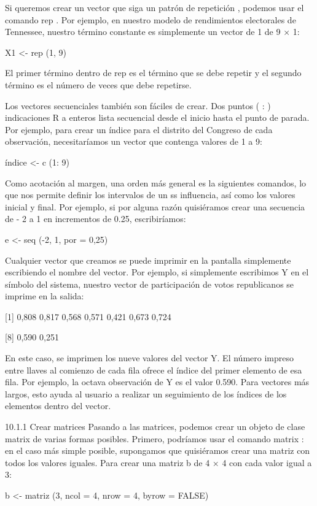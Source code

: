 \documentclass[
]{book}
\begin{document}
Si queremos crear un vector que siga un patrón de repetición , podemos usar el comando rep . Por ejemplo, en nuestro modelo de rendimientos electorales de Tennessee, nuestro término constante es simplemente un vector de 1 de 9 × 1:

X1 \textless- rep (1, 9)

El primer término dentro de rep es el término que se debe repetir y el segundo término es el número de veces que debe repetirse.

Los vectores secuenciales también son fáciles de crear. Dos puntos ( : ) indicaciones R a enteros lista secuencial desde el inicio hasta el punto de parada. Por ejemplo, para crear un índice para el distrito del Congreso de cada observación, necesitaríamos un vector que contenga valores de 1 a 9:

índice \textless- c (1: 9)

Como acotación al margen, una orden más general es la siguientes comandos, lo que nos permite definir los intervalos de un ss influencia, así como los valores inicial y final. Por ejemplo, si por alguna razón quisiéramos crear una secuencia de - 2 a 1 en incrementos de 0.25, escribiríamos:

e \textless- seq (-2, 1, por = 0,25)

Cualquier vector que creamos se puede imprimir en la pantalla simplemente escribiendo el nombre del vector. Por ejemplo, si simplemente escribimos Y en el símbolo del sistema, nuestro vector de participación de votos republicanos se imprime en la salida:

{[}1{]} 0,808 0,817 0,568 0,571 0,421 0,673 0,724

{[}8{]} 0,590 0,251

En este caso, se imprimen los nueve valores del vector Y. El número impreso entre llaves al comienzo de cada fila ofrece el índice del primer elemento de esa fila. Por ejemplo, la octava observación de Y es el valor 0.590. Para vectores más largos, esto ayuda al usuario a realizar un seguimiento de los índices de los elementos dentro del vector.

10.1.1 Crear matrices
Pasando a las matrices, podemos crear un objeto de clase matrix de varias formas posibles. Primero, podríamos usar el comando matrix : en el caso más simple posible, supongamos que quisiéramos crear una matriz con todos los valores iguales. Para crear una matriz b de 4 × 4 con cada valor igual a 3:

b \textless- matriz (3, ncol = 4, nrow = 4, byrow = FALSE)
\end{document}
